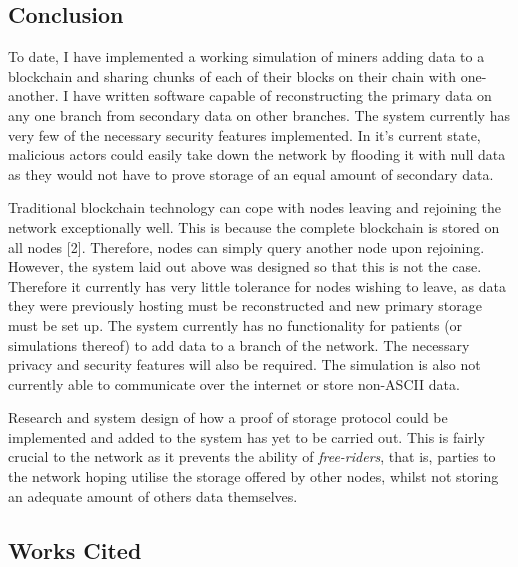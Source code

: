 \documentclass[]{article}
\begin{document}
\hypertarget{header-n151}{%
\subsection{Conclusion}\label{header-n151}}

To date, I have implemented a working simulation of miners adding data
to a blockchain and sharing chunks of each of their blocks on their
chain with one-another. I have written software capable of
reconstructing the primary data on any one branch from secondary data on
other branches. The system currently has very few of the necessary
security features implemented. In it's current state, malicious actors
could easily take down the network by flooding it with null data as they
would not have to prove storage of an equal amount of secondary data.

Traditional blockchain technology can cope with nodes leaving and
rejoining the network exceptionally well. This is because the complete
blockchain is stored on all nodes {[}2{]}. Therefore, nodes can simply
query another node upon rejoining. However, the system laid out above
was designed so that this is not the case. Therefore it currently has
very little tolerance for nodes wishing to leave, as data they were
previously hosting must be reconstructed and new primary storage must be
set up. The system currently has no functionality for patients (or
simulations thereof) to add data to a branch of the network. The
necessary privacy and security features will also be required. The
simulation is also not currently able to communicate over the internet
or store non-ASCII data.

Research and system design of how a proof of storage protocol could be
implemented and added to the system has yet to be carried out. This is
fairly crucial to the network as it prevents the ability of
\emph{free-riders}, that is, parties to the network hoping utilise the
storage offered by other nodes, whilst not storing an adequate amount of
others data themselves.

\hypertarget{header-n155}{%
\subsection{Works Cited}\label{header-n155}}
\end{document}
